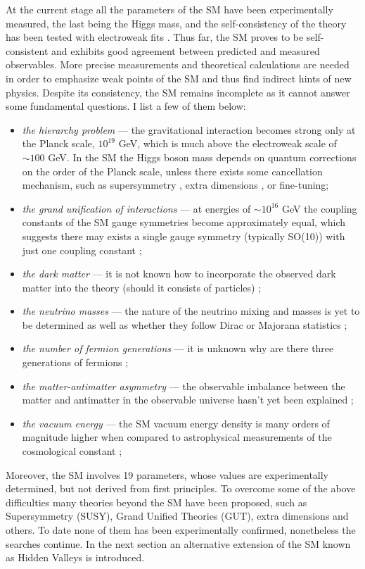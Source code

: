 At the current stage all the parameters of the SM have been experimentally measured,
the last being the Higgs mass, and the
self-consistency of the theory has been tested with electroweak fits \cite{Baak:2013ppa}.
Thus far, the SM proves to be self-consistent and exhibits good agreement between
predicted and measured observables. More precise measurements and theoretical calculations
are needed in order to emphasize weak points of the SM and thus
find indirect hints of new physics.
Despite its consistency, the SM remains incomplete as it cannot answer some fundamental 
questions. I list a few of them below:
\begin{itemize}
 \item {\it the hierarchy problem} --- the gravitational interaction becomes strong only at the 
Planck scale, $10^{19}$ GeV, which is much above the electroweak scale of $\sim 100$ GeV. 
In the SM the Higgs boson mass 
depends on quantum corrections on the order of the Planck scale, unless there
exists some cancellation mechanism, such as supersymmetry \cite{Martin:1997ns}, extra dimensions
\cite{ArkaniHamed:1998rs,Zee:2003mt}, or fine-tuning; 
 \item {\it the grand unification of interactions} --- at energies of $\sim 10^{16}$ GeV
the coupling constants of the SM gauge symmetries become approximately equal, which suggests
there may exists a single gauge symmetry (typically SO(10)) with just one coupling constant
\cite{Georgi:1974sy,Buras197866};
 \item {\it the dark matter} --- it is not known how to incorporate the observed
 dark matter into the theory (should it consists of particles) \cite{Bertone2005279};
 \item {\it the neutrino masses} --- the nature of the neutrino mixing and masses is yet to be
determined as well as whether they follow Dirac or Majorana statistics \cite{Fukuda:1998fd};
 \item {\it the number of fermion generations} --- it is unknown why are there three generations
of fermions \cite{Decamp:1989tu};
 \item {\it the matter-antimatter asymmetry} --- the observable imbalance between the matter and
antimatter in the observable universe hasn't yet been explained \cite{Fukugita:1986hr};
 \item {\it the vacuum energy} --- the SM vacuum
energy density is many orders of magnitude higher when compared to astrophysical measurements
of the cosmological constant \cite{Sahni:1999gb,Rugh2002663};
\end{itemize}
Moreover, the SM involves 19 parameters, whose values are experimentally determined, but not derived from
first principles.
To overcome some of the above difficulties many theories beyond the SM have been
proposed, such as Supersymmetry (SUSY), Grand Unified Theories (GUT), extra dimensions and others.
To date none of them has been experimentally confirmed, nonetheless the searches continue.
In the next section an alternative extension of the SM known as Hidden Valleys 
is introduced. 

